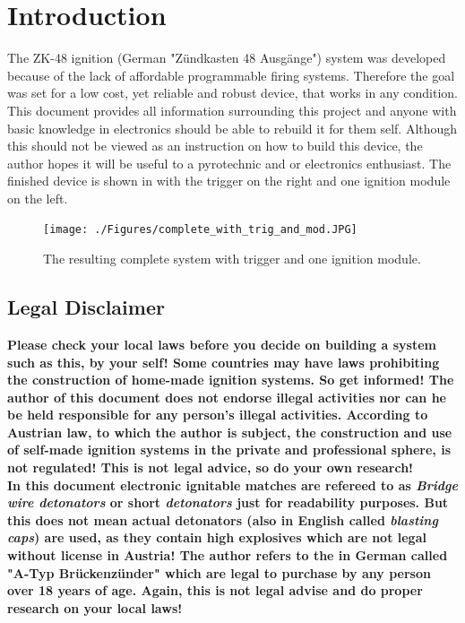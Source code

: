 
\section{Introduction}
The ZK-48 ignition (German "Zündkasten 48 Ausgänge") system was developed because of the lack of affordable  programmable firing systems. Therefore the goal was set for a low cost, yet reliable and robust device, that works in any condition. This document provides all information surrounding this project and anyone with basic knowledge in electronics should be able to rebuild it for them self. Although this should not be viewed as an instruction on how to build this device, the author hopes it will be useful to a pyrotechnic and or electronics enthusiast. The finished device is shown in  with the trigger on the right and one ignition module on the left.

\begin{figure}[!ht]
    \centering
    \texttt{[image: ./Figures/complete\_with\_trig\_and\_mod.JPG]}
    \caption{The resulting complete system with trigger and one ignition module.}
    \label{fig:complete_with_trig_and_mod}     
\end{figure}

\subsection{Legal Disclaimer}
\textbf{Please check your local laws before you decide on building a system such as this, by your self! Some countries may have laws prohibiting the construction of home-made ignition systems. So get informed! The author of this document does not endorse illegal activities nor can he be held responsible for any person's illegal activities. According to Austrian law, to which the author is subject, the construction and use of self-made ignition systems in the private and professional sphere, is not regulated! This is not legal advice, so do your own research!}\\

\noindent \textbf{In this document electronic ignitable matches are refereed to as \textit{Bridge wire detonators} or short \textit{detonators} just for readability purposes. But this does not mean actual detonators (also in English called \textit{blasting caps}) are used, as they contain high explosives which are not legal without license in Austria! The author refers to the in German called "A-Typ Brückenzünder" which are legal to purchase by any person over 18 years of age. Again, this is not legal advise and do proper research on your local laws!}

